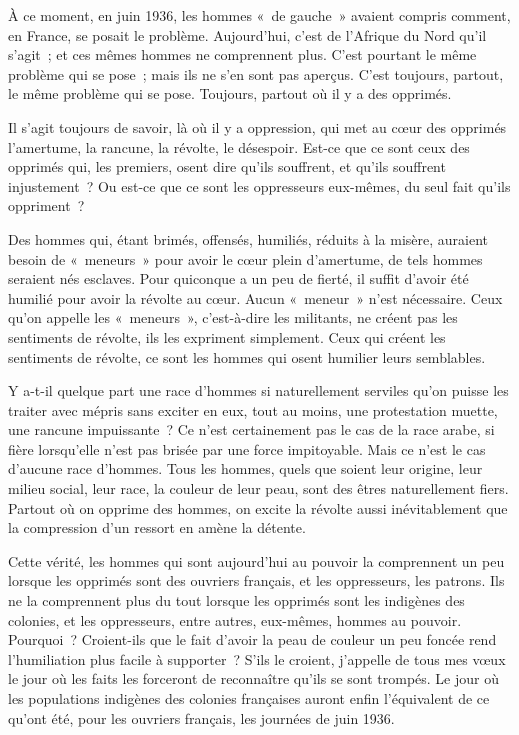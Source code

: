 \documentclass[french,twoside]{book} %
\begin{document}
À ce moment, en juin 1936, les hommes « de gauche » avaient compris comment, en France, se posait le problème. Aujourd'hui, c'est de l'Afrique du Nord qu'il s'agit ; et ces mêmes hommes ne comprennent plus. C'est pourtant le même problème qui se pose ; mais ils ne s'en sont pas aperçus. C'est toujours, partout, le même problème qui se pose. Toujours, partout où il y a des opprimés.\par
Il s'agit toujours de savoir, là où il y a oppression, qui met au cœur des opprimés l'amertume, la rancune, la révolte, le désespoir. Est-ce que ce sont ceux des opprimés qui, les premiers, osent dire qu'ils souffrent, et qu'ils souffrent injustement ? Ou est-ce que ce sont les oppresseurs eux-mêmes, du seul fait qu'ils oppriment ?\par
Des hommes qui, étant brimés, offensés, humiliés, réduits à la misère, auraient besoin de « meneurs » pour avoir le cœur plein d'amertume, de tels hommes seraient nés esclaves. Pour quiconque a un peu de fierté, il suffit d'avoir été humilié pour avoir la révolte au cœur. Aucun « meneur » n'est nécessaire. Ceux qu'on appelle les « meneurs », c'est-à-dire les militants, ne créent pas les sentiments de révolte, ils les expriment simplement. Ceux qui créent les sentiments de révolte, ce sont les hommes qui osent humilier leurs semblables.\par
Y a-t-il quelque part une race d'hommes si naturellement serviles qu'on puisse les traiter avec mépris sans exciter en eux, tout au moins, une protestation muette, une rancune impuissante ? Ce n'est certainement pas le cas de la race arabe, si fière lorsqu'elle n'est pas brisée par une force impitoya­ble. Mais ce n'est le cas d'aucune race d'hommes. Tous les hommes, quels que soient leur origine, leur milieu social, leur race, la couleur de leur peau, sont des êtres naturellement fiers. Partout où on opprime des hommes, on excite la révolte aussi inévitablement que la compression d'un ressort en amène la détente.\par
Cette vérité, les hommes qui sont aujourd'hui au pouvoir la comprennent un peu lorsque les opprimés sont des ouvriers français, et les oppresseurs, les patrons. Ils ne la comprennent plus du tout lorsque les opprimés sont les indigènes des colonies, et les oppresseurs, entre autres, eux-mêmes, hommes au pouvoir. Pourquoi ? Croient-ils que le fait d'avoir la peau de couleur un peu foncée rend l'humiliation plus facile à supporter ? S'ils le croient, j'appelle de tous mes vœux le jour où les faits les forceront de reconnaître qu'ils se sont trompés. Le jour où les populations indigènes des colonies françaises auront enfin l'équivalent de ce qu'ont été, pour les ouvriers français, les journées de juin 1936.\par
\end{document}
